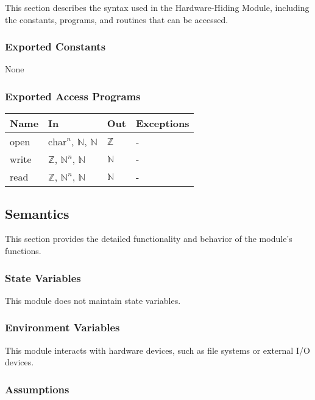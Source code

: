 \documentclass[12pt, titlepage]{article}
\begin{document}
This section describes the syntax used in the Hardware-Hiding Module, including
the constants, programs, and routines that can be accessed.

\subsubsection{Exported Constants}

None

\subsubsection{Exported Access Programs}

\begin{center}
\begin{tabular}{p{2cm} p{4cm} p{4cm} p{2cm}}
\hline
\textbf{Name} & \textbf{In} & \textbf{Out} & \textbf{Exceptions} \\
\hline
open & $\text{char}^n$, $\mathbb{N}$, $\mathbb{N}$ & $\mathbb{Z}$ & - \\
write & $\mathbb{Z}$, $\mathbb{N}^n$, $\mathbb{N}$ & $\mathbb{N}$ & - \\
read & $\mathbb{Z}$, $\mathbb{N}^n$, $\mathbb{N}$ & $\mathbb{N}$ & - \\
\hline
\end{tabular}
\end{center}

\subsection{Semantics}

This section provides the detailed functionality and behavior of the module’s
functions.

\subsubsection{State Variables}

This module does not maintain state variables.

\subsubsection{Environment Variables}

This module interacts with hardware devices, such as file systems or external
I/O devices.

\subsubsection{Assumptions}
\end{document}
